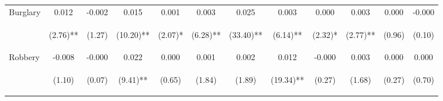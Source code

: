\begin{tabular}{lccccccccccc}
\noalign{\smallskip}Burglary & 0.012 & -0.002 & 0.015 & 0.001 & 0.003 & 0.025 & 0.003 & 0.000 & 0.003 & 0.000 & -0.000\\
 & \begin{footnotesize}(2.76)**\end{footnotesize} & \begin{footnotesize}(1.27)\end{footnotesize} & \begin{footnotesize}(10.20)**\end{footnotesize} & \begin{footnotesize}(2.07)*\end{footnotesize} & \begin{footnotesize}(6.28)**\end{footnotesize} & \begin{footnotesize}(33.40)**\end{footnotesize} & \begin{footnotesize}(6.14)**\end{footnotesize} & \begin{footnotesize}(2.32)*\end{footnotesize} & \begin{footnotesize}(2.77)**\end{footnotesize} & \begin{footnotesize}(0.96)\end{footnotesize} & \begin{footnotesize}(0.10)\end{footnotesize}\\
\noalign{\smallskip}Robbery & -0.008 & -0.000 & 0.022 & 0.000 & 0.001 & 0.002 & 0.012 & -0.000 & 0.003 & 0.000 & 0.000\\
 & \begin{footnotesize}(1.10)\end{footnotesize} & \begin{footnotesize}(0.07)\end{footnotesize} & \begin{footnotesize}(9.41)**\end{footnotesize} & \begin{footnotesize}(0.65)\end{footnotesize} & \begin{footnotesize}(1.84)\end{footnotesize} & \begin{footnotesize}(1.89)\end{footnotesize} & \begin{footnotesize}(19.34)**\end{footnotesize} & \begin{footnotesize}(0.27)\end{footnotesize} & \begin{footnotesize}(1.68)\end{footnotesize} & \begin{footnotesize}(0.27)\end{footnotesize} & \begin{footnotesize}(0.70)\end{footnotesize}\\

\end{tabular}
